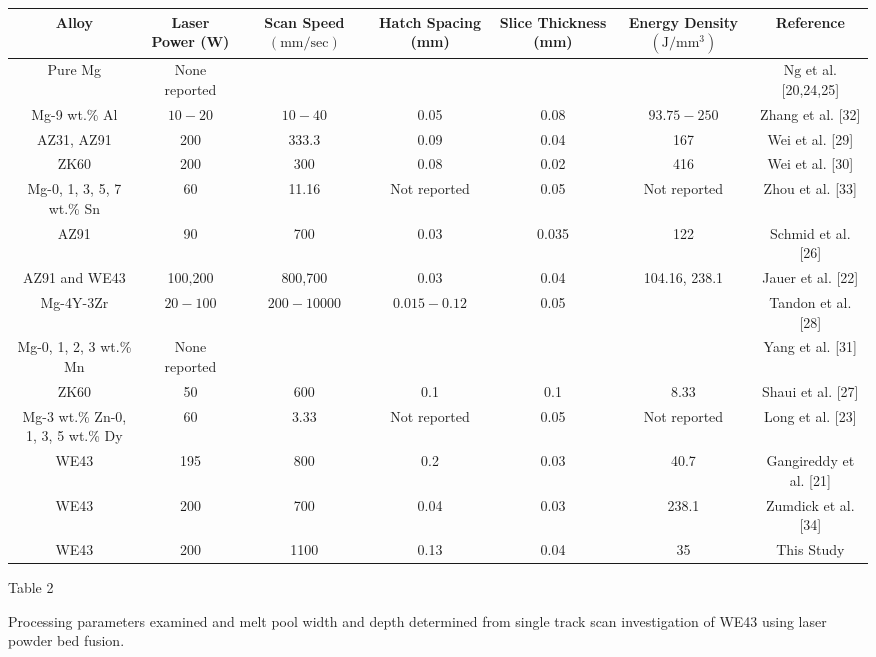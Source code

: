 \documentclass[10pt]{article}
\begin{document}
\begin{center}
\begin{tabular}{|c|c|c|c|c|c|c|}
\hline
Alloy & Laser Power (W) & Scan Speed $(\mathrm{mm} / \mathrm{sec})$ & Hatch Spacing (mm) & Slice Thickness (mm) & Energy Density $\left(\mathrm{J} / \mathrm{mm}^{3}\right)$ & Reference \\
\hline
Pure Mg & None reported &  &  &  &  & $\mathrm{Ng}$ et al. [20,24,25] \\
\hline
Mg-9 wt.\% Al & $10-20$ & $10-40$ & 0.05 & 0.08 & $93.75-250$ & Zhang et al. [32] \\
\hline
AZ31, AZ91 & 200 & 333.3 & 0.09 & 0.04 & 167 & Wei et al. [29] \\
\hline
ZK60 & 200 & 300 & 0.08 & 0.02 & 416 & Wei et al. [30] \\
\hline
Mg-0, 1, 3, 5, 7 wt.\% Sn & 60 & 11.16 & Not reported & 0.05 & Not reported & Zhou et al. [33] \\
\hline
AZ91 & 90 & 700 & 0.03 & 0.035 & 122 & Schmid et al. [26] \\
\hline
AZ91 and WE43 & 100,200 & 800,700 & 0.03 & 0.04 & 104.16, 238.1 & Jauer et al. [22] \\
\hline
Mg-4Y-3Zr & $20-100$ & $200-10000$ & $0.015-0.12$ & 0.05 &  & Tandon et al. [28] \\
\hline
Mg-0, 1, 2, 3 wt.\% Mn & None reported &  &  &  &  & Yang et al. [31] \\
\hline
ZK60 & 50 & 600 & 0.1 & 0.1 & 8.33 & Shaui et al. [27] \\
\hline
Mg-3 wt.\% Zn-0, 1, 3, 5 wt.\% Dy & 60 & 3.33 & Not reported & 0.05 & Not reported & Long et al. [23] \\
\hline
WE43 & 195 & 800 & 0.2 & 0.03 & 40.7 & Gangireddy et al. [21] \\
\hline
WE43 & 200 & 700 & 0.04 & 0.03 & 238.1 & Zumdick et al. [34] \\
\hline
WE43 & 200 & 1100 & 0.13 & 0.04 & 35 & This Study \\
\hline
\end{tabular}
\end{center}

Table 2

Processing parameters examined and melt pool width and depth determined from single track scan investigation of WE43 using laser powder bed fusion.
\end{document}
